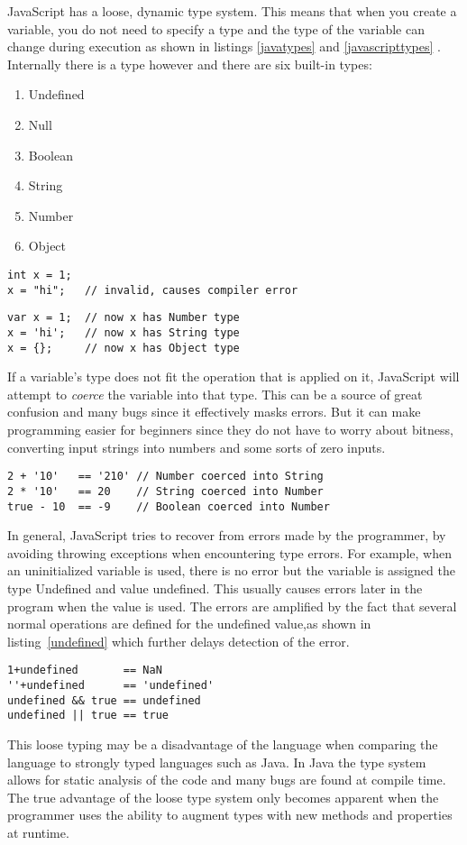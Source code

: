 JavaScript has a loose, dynamic type system. This means that when you create a variable, you do not need to specify a type and the type of the variable can change during execution as shown in listings \ref{javatypes} and \ref{javascripttypes} . Internally there is a type however and there are six built-in types\cite{2ality}:
	\begin{enumerate}
	\item Undefined
	\item Null
	\item Boolean
	\item String
	\item Number
	\item Object
	\end{enumerate}
\begin{lstlisting}[caption=Changing type of variable in Java,label={javatypes}]
int x = 1;
x = "hi";   // invalid, causes compiler error
\end{lstlisting}

\begin{lstlisting}[caption=Changing type of variable in JavaScript,label={javascripttypes}]
var x = 1;  // now x has Number type
x = 'hi';   // now x has String type
x = {};     // now x has Object type
\end{lstlisting}
	If a variable's type does not fit the operation that is applied on it, JavaScript will attempt to \emph{coerce} the variable into that type. This can be a source of great confusion and many bugs since it effectively masks errors. But it can make programming easier for beginners since they do not have to worry about bitness, converting input strings into numbers and some sorts of zero inputs.
\begin{lstlisting}[caption=Automatic type coercion]
2 + '10'   == '210' // Number coerced into String
2 * '10'   == 20    // String coerced into Number
true - 10  == -9    // Boolean coerced into Number
\end{lstlisting}

	In general, JavaScript tries to recover from errors made by the programmer, by avoiding throwing exceptions when encountering type errors. For example, when an uninitialized variable is used, there is no error but the variable is assigned the type Undefined and value undefined. This usually causes errors later in the program when the value is used. The errors are amplified by the fact that several normal operations are defined for the undefined value,as shown in listing~\ref{undefined} which further delays detection of the error.
\begin{lstlisting}[caption=Normal operations on undefined value,label=undefined]
1+undefined       == NaN
''+undefined      == 'undefined'
undefined && true == undefined
undefined || true == true
\end{lstlisting}	
This loose typing may be a disadvantage of the language when comparing the language to strongly typed languages such as Java. In Java the type system allows for static analysis of the code and many bugs are found at compile time. The true advantage of the loose type system only becomes apparent when the programmer uses the ability to augment types with new methods and properties at runtime.

